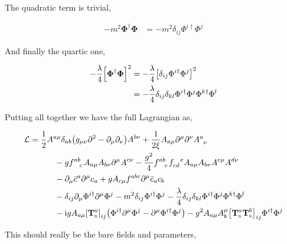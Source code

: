 The quadratic term is trivial,

\begin{align}
    -m^2\boldsymbol\Phi^\dagger\boldsymbol\Phi&=-m^2\delta_{ij}\Phi^{i\dagger}\Phi^j\nonumber
\end{align}

And finally the quartic one,

\begin{align}
    -\frac{\lambda}{4}\qty[\boldsymbol\Phi^\dagger\boldsymbol\Phi]^2&=-\frac\lambda4\qty[\delta_{ij}\Phi^{i\dagger}\Phi^{j}]^2\nonumber\\
    &=-\frac\lambda4\delta_{ij}\delta_{kl}\Phi^{i\dagger}\Phi^{j}\Phi^{k\dagger}\Phi^{l}\nonumber
\end{align}

Putting all together we have the full Lagrangian as,

\begin{align}
    \mathcal L&=\frac12A^{a\mu}\delta_{ab}\qty(g_{\mu\nu}\partial^2 -\partial_\mu\partial_\nu )A^{b\nu}+\frac{1}{2\xi} A_{a\mu}\partial^\mu\partial^\nu \tensor{A}{^a_\nu}\nonumber\\
    &\quad\quad\quad-g\tensor{f}{^a^b_c}A_{a\mu}A_{b\nu}\partial^\mu A^{c\nu}-\frac{g^2}{4}\tensor{f}{^a^b_e}\tensor{f}{_c_d^e}A_{a\mu}A_{b\nu}A^{c\mu}A^{d\nu}\nonumber\\
    &\quad\quad\quad -\partial_\mu\bar c^a\partial^\mu c_a+g A_{c\mu}\tensor{f}{^a^b^c}\partial^\mu \bar c_ac_b\nonumber\\
    &\quad\quad\quad-\delta_{ij}\partial_\mu\Phi^{i\dagger}\partial^\mu\Phi^j-m^2\delta_{ij}\Phi^{i\dagger}\Phi^j
    -\frac\lambda4\delta_{ij}\delta_{kl}\Phi^{i\dagger}\Phi^{j}\Phi^{k\dagger}\Phi^{l}\nonumber\\
    &\quad\quad\quad
    -\im gA_{a\mu}\tensor{\qty[\vb T^{a}_{\textnormal s}]}{_i_j}\qty(\Phi^{i\dagger}\partial^\mu\Phi^j-\partial^\mu\Phi^{i\dagger}\Phi^j)
    -g^2A_{a\mu}A_b^\mu
    \tensor{\qty[\vb T^{a}_{\textnormal s}\vb T^b_{\textnormal s}]}{_i_j}
    \Phi^{i\dagger}\Phi^j\nonumber
\end{align}

This should really be the bare fields and parameters,

